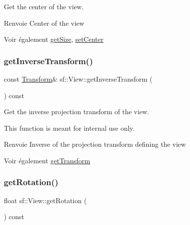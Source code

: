 Get the center of the view. 

\begin{DoxyReturn}{Renvoie}
Center of the view
\end{DoxyReturn}
\begin{DoxySeeAlso}{Voir également}
\hyperlink{classsf_1_1View_a5432748dd3a78ac4019dfbde208c7cc1}{get\+Size}, \hyperlink{classsf_1_1View_aa8e3fedb008306ff9811163545fb75f2}{set\+Center} 
\end{DoxySeeAlso}
\mbox{\label{classsf_1_1View_acd2b001cf2a646f62e7d9e792d7d5f0d}} 
\subsubsection{\texorpdfstring{get\+Inverse\+Transform()}{getInverseTransform()}}
{\footnotesize\ttfamily const \hyperlink{classsf_1_1Transform}{Transform}\& sf\+::\+View\+::get\+Inverse\+Transform (\begin{DoxyParamCaption}{ }\end{DoxyParamCaption}) const}



Get the inverse projection transform of the view. 

This function is meant for internal use only.

\begin{DoxyReturn}{Renvoie}
Inverse of the projection transform defining the view
\end{DoxyReturn}
\begin{DoxySeeAlso}{Voir également}
\hyperlink{classsf_1_1View_a13da786526688bf99dc2cd3e658a3c2a}{get\+Transform} 
\end{DoxySeeAlso}
\mbox{\label{classsf_1_1View_a324d8885f4ab17f1f7b0313580c9b84e}} 
\subsubsection{\texorpdfstring{get\+Rotation()}{getRotation()}}
{\footnotesize\ttfamily float sf\+::\+View\+::get\+Rotation (\begin{DoxyParamCaption}{ }\end{DoxyParamCaption}) const}



